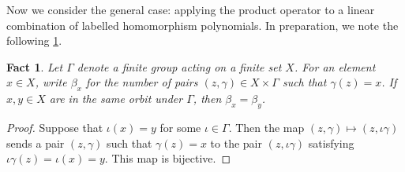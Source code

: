 \documentclass[10pt,a4paper]{article}
\theoremstyle{definition}
\newtheorem{example}[definition]{Example}
\theoremstyle{plain}
\newtheorem{fact}[definition]{Fact}
\theoremstyle{remark}
\begin{document}
%

	Now we consider the general case: applying the product operator to a linear combination of labelled homomorphism polynomials.
	In preparation, we note the following \cref{fact:orbits}.

	\begin{fact}\label{fact:orbits}
		Let $\Gamma$ denote a finite group acting on a finite set $X$.
		For an element $x \in X$, write $\beta_x$ for the number of pairs $(z, \gamma) \in X \times \Gamma$ such that $\gamma(z) = x$.
		If $x, y \in X$ are in the same orbit under $\Gamma$,
		then $\beta_x = \beta_y$.
	\end{fact}
	\begin{proof}
		Suppose that $\iota(x) = y$ for some $\iota \in \Gamma$.
		Then the map $(z, \gamma) \mapsto (z, \iota \gamma )$ sends a pair $(z, \gamma)$ such that $\gamma(z) = x$ to the pair $(z, \iota \gamma)$ satisfying $\iota \gamma (z) = \iota(x) = y$.
		This map is bijective.
	\end{proof}
\end{document}
